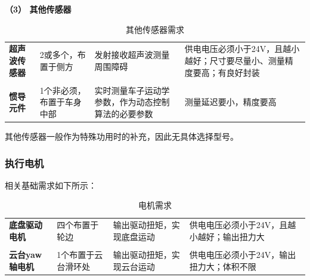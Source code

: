 
\textbf{（3） 其他传感器}

\begin{table}[H]
	\centering%
	\caption[centering]{其他传感器需求}%
	\label{qtxq}%
	\begin{tabular}{C{2cm}C{3cm}p{3cm}p{4cm}}	
		\toprule
		 & & &\\ 
		\midrule
		
		\textbf{超声波传感器} & 2或多个，布置于侧方 & 发射接收超声波测量周围障碍 & 供电电压必须小于24V，且越小越好；尺寸要尽量小、测量精度要高；有良好封装 \\
		\\
		\textbf{惯导元件} & 1个非必须，布置于车身中部 & 实时测量车子运动学参数，作为动态控制算法的必要参数 & 测量延迟要小，精度要高 \\		
		
		\bottomrule
	\end{tabular}
\end{table}

其他传感器一般作为特殊功用时的补充，因此无具体选择型号。

\subsubsection{执行电机}

相关基础需求如下所示：

\begin{table}[H]
	\centering%
	\caption[centering]{电机需求}%
	\label{motorxq}%
	\begin{tabular}{C{2cm}C{3cm}p{3cm}p{4cm}}	
		\toprule
		 & & &\\ 
		\midrule
		
		\textbf{底盘驱动电机} & 四个布置于轮边 & 输出驱动扭矩，实现底盘运动 & 供电电压必须小于24V，且越小越好；输出扭力大 \\
		\\
		\textbf{云台yaw轴电机} & 1个布置于云台滑环处 & 输出驱动扭矩，实现云台运动 & 供电电压必须小于24V，输出扭力大；体积不限 \\		
		
		\bottomrule
	\end{tabular}
\end{table}

